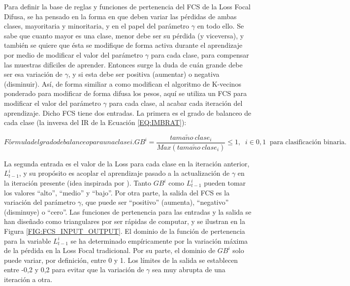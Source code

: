 Para definir la base de reglas y funciones de pertenencia del FCS de la Loss Focal Difusa, se ha pensado en la forma en que deben variar las pérdidas de ambas clases, mayoritaria y minoritaria, y en el papel del parámetro $\gamma$ en todo ello. Se sabe que cuanto mayor es una clase, menor debe ser su pérdida (y viceversa), y también se quiere que ésta se modifique de forma activa durante el aprendizaje por medio de modificar el valor del parámetro $\gamma$ para cada clase, para compensar las muestras difíciles de aprender. Entonces surge la duda de cuán grande debe ser esa variación de $\gamma$, y si esta debe ser positiva (aumentar) o negativa (disminuir). Así, de forma similiar a como \citet{patel2017classification} modifican el algoritmo de K-vecinos ponderado para modificar de forma difusa los pesos, aquí se utiliza un FCS para modificar el valor del parámetro $\gamma$ para cada clase, al acabar cada iteración del aprendizaje. Dicho FCS tiene dos entradas. La primera es el grado de balanceo de cada clase (la inversa del IR de la Ecuación \ref{EQ:IMBRAT}):

\begin{equation}[EQ:BALANCE_DEG]{Fórmula del grado de balanceo para una clase i.}
   GB^i = \frac{tama\tilde{n}o\ clase_i}{Max(tama\tilde{n}o\ clase_i)} \leq 1, \;\; i \in {0,1} \;\; \text{para clasificación binaria.}
\end{equation}

La segunda entrada es el valor de la Loss para cada clase en la iteración anterior, $L^i_{t-1}$, y su propósito es acoplar el aprendizaje pasado a la actualización de $\gamma$ en la iteración presente (idea inspirada por \citet{burduk2008possibility}). Tanto $GB^i$ como $L^i_{t-1}$ pueden tomar los valores ``alto'', ``medio'' y ``bajo''. Por otra parte, la salida del FCS es la variación del parámetro $\gamma$, que puede ser ``positivo'' (aumenta), ``negativo'' (disminuye) o ``cero''. Las funciones de pertenencia para las entradas y la salida se han diseñado como triangulares por ser rápidas de computar, y se ilustran en la Figura \ref{FIG:FCS_INPUT_OUTPUT}. El dominio de la función de pertenencia para la variable $L^i_{t-1}$ se ha determinado empíricamente por la variación máxima de la pérdida en la Loss Focal tradicional. Por su parte, el dominio de $GB^i$ solo puede variar, por definición, entre 0 y 1. Los límites de la salida se establecen entre -0,2 y 0,2 para evitar que la variación de $\gamma$ sea muy abrupta de una iteración a otra.


